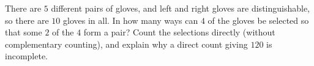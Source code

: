 There are $5$ different pairs of gloves, and left and right gloves are distinguishable, so there are $10$ gloves in all. In how many ways can $4$ of the gloves be selected so that some $2$ of the $4$ form a pair? Count the selections directly (without complementary counting), and explain why a direct count giving $120$ is incomplete.
